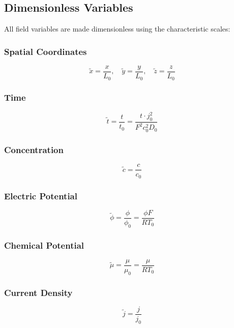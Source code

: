 \documentclass[11pt,a4paper]{article}
\newcommand{\tildevar}[1]{\tilde{#1}}
\begin{document}
\subsection{Dimensionless Variables}

All field variables are made dimensionless using the characteristic scales:

\subsubsection{Spatial Coordinates}
\begin{equation}
\tildevar{x} = \frac{x}{L_0}, \quad \tildevar{y} = \frac{y}{L_0}, \quad \tildevar{z} = \frac{z}{L_0}
\end{equation}

\subsubsection{Time}
\begin{equation}
\tildevar{t} = \frac{t}{t_0} = \frac{t \cdot j_0^2}{F^2 c_0^2 D_0}
\end{equation}

\subsubsection{Concentration}
\begin{equation}
\tildevar{c} = \frac{c}{c_0}
\end{equation}

\subsubsection{Electric Potential}
\begin{equation}
\tildevar{\phi} = \frac{\phi}{\phi_0} = \frac{\phi F}{RT_0}
\end{equation}

\subsubsection{Chemical Potential}
\begin{equation}
\tildevar{\mu} = \frac{\mu}{\mu_0} = \frac{\mu}{RT_0}
\end{equation}

\subsubsection{Current Density}
\begin{equation}
\tildevar{j} = \frac{j}{j_0}
\end{equation}
\end{document}
